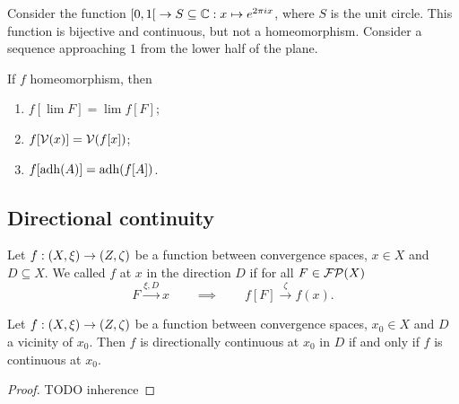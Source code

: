 \begin{example}
Consider the function $\interval[co]{0,1} \to S\subseteq\C: x\mapsto e^{2\pi i x}$, where $S$ is the unit circle. This function is bijective and continuous, but not a homeomorphism. Consider a sequence approaching $1$ from the lower half of the plane.
\end{example}

\begin{proposition} \label{homeomorphismPreservation}
If $f$ homeomorphism, then
\begin{enumerate}
\item $f[\lim F] = \lim f[F]$;
\item $f[\operatorname{\mathcal{V}}(x)] = \operatorname{\mathcal{V}}(f[x])$;
\item $f[\operatorname{adh}(A)] = \operatorname{adh}(f[A])$.
\end{enumerate}
\end{proposition}


\subsection{Directional continuity}
\begin{definition}
Let $f: \left( X,\xi \right) \to \left( Z,\zeta \right)$ be a function between convergence spaces, $x\in X$ and $D\subseteq X$. We called $f$  at $x$ in the direction $D$ if for all $F\in\operatorname{\mathcal{FP}}(X)$
\[ F \overset{\xi,D}{\longrightarrow} x \qquad \implies \qquad f[F] \overset{\zeta}{\longrightarrow} f(x). \]
\end{definition}

\begin{lemma}
Let $f: \left( X,\xi \right) \to \left( Z,\zeta \right)$ be a function between convergence spaces, $x_0\in X$ and $D$ a vicinity of $x_0$. Then $f$ is directionally continuous at $x_0$ in $D$ \textup{if and only if} $f$ is continuous at $x_0$.
\end{lemma}
\begin{proof}
TODO inherence
\end{proof}

